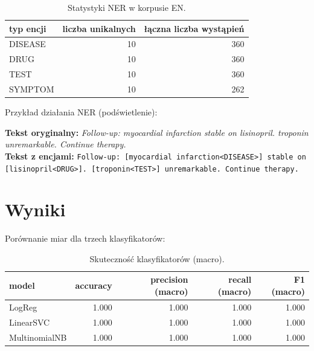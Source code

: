 \documentclass[12pt,a4paper]{article}
\begin{document}
\begin{table}[H]
\centering
\begin{tabular}{lrr}
\toprule
typ encji & liczba unikalnych & łączna liczba wystąpień \\
\midrule
DISEASE & 10 & 360 \\
DRUG & 10 & 360 \\
TEST & 10 & 360 \\
SYMPTOM & 10 & 262 \\
\bottomrule
\end{tabular}

\caption{Statystyki NER w korpusie EN.}
\label{tab:ent}
\end{table}

Przykład działania NER (podświetlenie):

\textbf{Tekst oryginalny:} \textit{Follow-up: myocardial infarction stable on lisinopril. troponin unremarkable. Continue therapy.}\\[2pt]
\textbf{Tekst z encjami:} \texttt{Follow-up: [myocardial infarction<DISEASE>] stable on [lisinopril<DRUG>]. [troponin<TEST>] unremarkable. Continue therapy.}

\section{Wyniki}
Porównanie miar dla trzech klasyfikatorów:

\begin{table}[H]
\centering
\begin{tabular}{lrrrr}
\toprule
model & accuracy & precision (macro) & recall (macro) & F1 (macro) \\
\midrule
LogReg & 1.000 & 1.000 & 1.000 & 1.000 \\
LinearSVC & 1.000 & 1.000 & 1.000 & 1.000 \\
MultinomialNB & 1.000 & 1.000 & 1.000 & 1.000 \\
\bottomrule
\end{tabular}

\caption{Skuteczność klasyfikatorów (macro).}
\label{tab:cmp}
\end{table}
\end{document}
